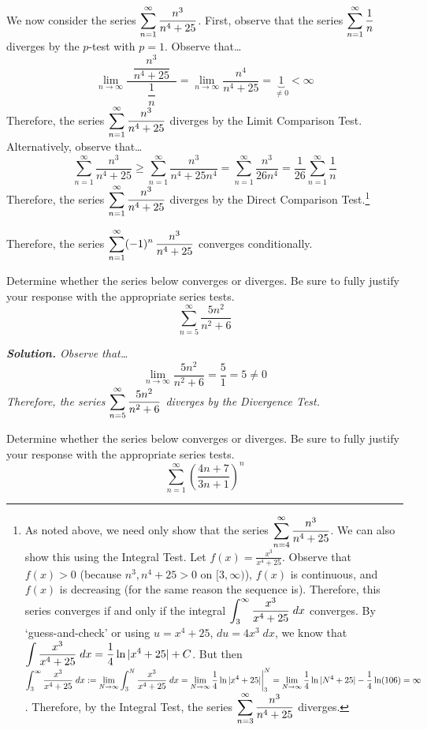 \documentclass[12pt,letterpaper]{exam}
\begin{document}
\begin{questions}
{We now consider the series $\displaystyle\sum_{n=1}^\infty \dfrac{n^3}{n^4 + 25}$. First, observe that the series $\displaystyle\sum_{n=1}^\infty \dfrac{1}{n}$ diverges by the $p$-test with $p= 1$. Observe that\dots
	\[
	\lim_{n \to \infty} \dfrac{\;\;\dfrac{n^3}{n^4 + 25}\;\;}{\dfrac{1}{n}}= \lim_{n \to \infty} \dfrac{n^4}{n^4 + 25}= \underbrace{1}_{\neq 0} < \infty
	\]
Therefore, the series $\displaystyle\sum_{n=1}^\infty \dfrac{n^3}{n^4 + 25}$ diverges by the Limit Comparison Test. Alternatively, observe that\dots
	\[
	\sum_{n=1}^\infty \dfrac{n^3}{n^4 + 25} \geq \sum_{n=1}^\infty \dfrac{n^3}{n^4 + 25n^4}= \sum_{n=1}^\infty \dfrac{n^3}{26n^4}= \dfrac{1}{26} \sum_{n=1}^\infty \dfrac{1}{n}
	\]
Therefore, the series $\displaystyle\sum_{n=1}^\infty \dfrac{n^3}{n^4 + 25}$ diverges by the Direct Comparison Test.\footnote{\tiny As noted above, we need only show that the series $\displaystyle\sum_{n=4}^\infty \frac{n^3}{n^4 + 25}$. We can also show this using the Integral Test. Let $f(x)= \frac{x^3}{x^4 + 25}$. Observe that $f(x) > 0$ (because $n^3, n^4 + 25 > 0$ on $[3, \infty)$), $f(x)$ is continuous, and $f(x)$ is decreasing (for the same reason the sequence is). Therefore, this series converges if and only if the integral $\displaystyle\int_3^\infty \frac{x^3}{x^4 + 25} \;dx$ converges. By `guess-and-check' or using $u= x^4 + 25$, $du= 4x^3 \;dx$, we know that $\displaystyle\int \frac{x^3}{x^4 + 25} \;dx= \frac{1}{4} \ln|x^4 + 25| + C$. But then $\displaystyle\int_3^\infty \frac{x^3}{x^4 + 25} \;dx:= \lim_{N \to \infty} \int_3^N \frac{x^3}{x^4 + 25} \;dx= \lim_{N \to \infty} \frac{1}{4} \ln|x^4 + 25| \bigg|_3^N= \lim_{N \to \infty} \frac{1}{4} \ln|N^4 + 25| - \frac{1}{4} \ln(106)= \infty$. Therefore, by the Integral Test, the series $\displaystyle\sum_{n=3}^\infty \frac{n^3}{n^4 + 25}$ diverges.} \pspace

Therefore, the series $\displaystyle\sum_{n=1}^\infty (-1)^n \, \dfrac{n^3}{n^4 + 25}$ converges conditionally.}



\newpage
\question[10] Determine whether the series below converges or diverges. Be sure to fully justify your response with the appropriate series tests.
	\[
	\sum_{n=5}^\infty \dfrac{5n^2}{n^2 + 6}
	\] \pspace

{\itshape \textbf{Solution.} Observe that\dots
	\[
	\lim_{n \to \infty} \dfrac{5n^2}{n^2 + 6}= \dfrac{5}{1}= 5 \neq 0
	\] \pspace
Therefore, the series $\displaystyle\sum_{n=5}^\infty \dfrac{5n^2}{n^2 + 6}$ diverges by the Divergence Test.}



\newpage
\question[10] Determine whether the series below converges or diverges. Be sure to fully justify your response with the appropriate series tests.
	\[
	\sum_{n=1}^\infty \left( \dfrac{4n + 7}{3n + 1} \right)^n
	\] \pspace


\end{questions}
\end{document}

